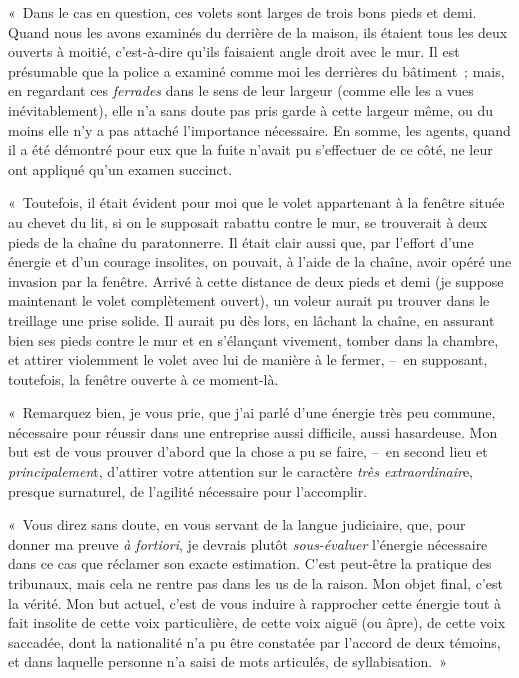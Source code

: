 \documentclass[french,twoside]{book} %
\begin{document}
« Dans le cas en question, ces volets sont larges de trois bons pieds et demi. Quand nous les avons examinés du derrière de la maison, ils étaient tous les deux ouverts à moitié, c’est-à-dire qu’ils faisaient angle droit avec le mur. Il est présumable que la police a examiné comme moi les derrières du bâtiment ; mais, en regardant ces \emph{ferrades} dans le sens de leur largeur (comme elle les a vues inévitablement), elle n’a sans doute pas pris garde à cette largeur même, ou du moins elle n’y a pas attaché l’importance nécessaire. En somme, les agents, quand il a été démontré pour eux que la fuite n’avait pu s’effectuer de ce côté, ne leur ont appliqué qu’un examen succinct.\par
« Toutefois, il était évident pour moi que le volet appartenant à la fenêtre située au chevet du lit, si on le supposait rabattu contre le mur, se trouverait à deux pieds de la chaîne du paratonnerre. Il était clair aussi que, par l’effort d’une énergie et d’un courage insolites, on pouvait, à l’aide de la chaîne, avoir opéré une invasion par la fenêtre. Arrivé à cette distance de deux pieds et demi (je suppose maintenant le volet complètement ouvert), un voleur aurait pu trouver dans le treillage une prise solide. Il aurait pu dès lors, en lâchant la chaîne, en assurant bien ses pieds contre le mur et en s’élançant vivement, tomber dans la chambre, et attirer violemment le volet avec lui de manière à le fermer, – en supposant, toutefois, la fenêtre ouverte à ce moment-là.\par
« Remarquez bien, je vous prie, que j’ai parlé d’une énergie très peu commune, nécessaire pour réussir dans une entreprise aussi difficile, aussi hasardeuse. Mon but est de vous prouver d’abord que la chose a pu se faire, – en second lieu et \emph{principalemen}t, d’attirer votre attention sur le caractère \emph{très extraordinair}e, presque surnaturel, de l’agilité nécessaire pour l’accomplir.\par
« Vous direz sans doute, en vous servant de la langue judiciaire, que, pour donner ma preuve \emph{à fortiori}, je devrais plutôt \emph{sous-évaluer} l’énergie nécessaire dans ce cas que réclamer son exacte estimation. C’est peut-être la pratique des tribunaux, mais cela ne rentre pas dans les us de la raison. Mon objet final, c’est la vérité. Mon but actuel, c’est de vous induire à rapprocher cette énergie tout à fait insolite de cette voix particulière, de cette voix aiguë (ou âpre), de cette voix saccadée, dont la nationalité n’a pu être constatée par l’accord de deux témoins, et dans laquelle personne n’a saisi de mots articulés, de syllabisation. »\par
\end{document}
